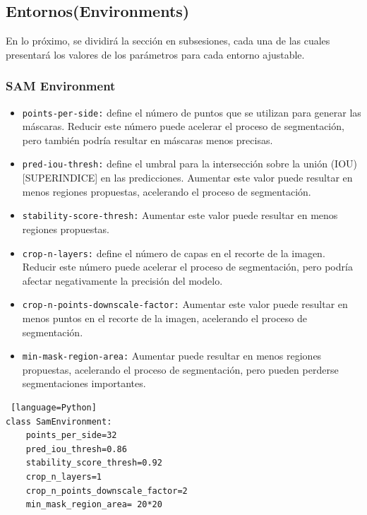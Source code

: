 \subsection{Entornos(Environments)}
En lo próximo, se dividirá la sección en subsesiones, cada una de las cuales presentará los valores de los parámetros para cada entorno ajustable.

\subsubsection*{SAM Environment}
\begin{itemize}
\item \verb|points-per-side:| define el número de puntos que se utilizan para generar las máscaras. Reducir este número puede acelerar el proceso de segmentación, pero también podría resultar en máscaras menos precisas.
\item \verb|pred-iou-thresh:| define el umbral para la intersección sobre la unión (IOU)[SUPERINDICE] en las predicciones. Aumentar este valor puede resultar en menos regiones propuestas, acelerando el proceso de segmentación.
\item \verb|stability-score-thresh:| Aumentar este valor puede resultar en menos regiones propuestas.
\item \verb|crop-n-layers:| define el número de capas en el recorte de la imagen. Reducir este número puede acelerar el proceso de segmentación, pero podría afectar negativamente la precisión del modelo.
\item \verb|crop-n-points-downscale-factor:| Aumentar este valor puede resultar en menos puntos en el recorte de la imagen, acelerando el proceso de segmentación.
\item \verb|min-mask-region-area:| Aumentar puede resultar en menos regiones propuestas, acelerando el proceso de segmentación, pero pueden perderse segmentaciones importantes.
\end{itemize}

\begin{lstlisting} [language=Python]
class SamEnvironment:
    points_per_side=32
    pred_iou_thresh=0.86
    stability_score_thresh=0.92
    crop_n_layers=1
    crop_n_points_downscale_factor=2
    min_mask_region_area= 20*20
\end{lstlisting} 


